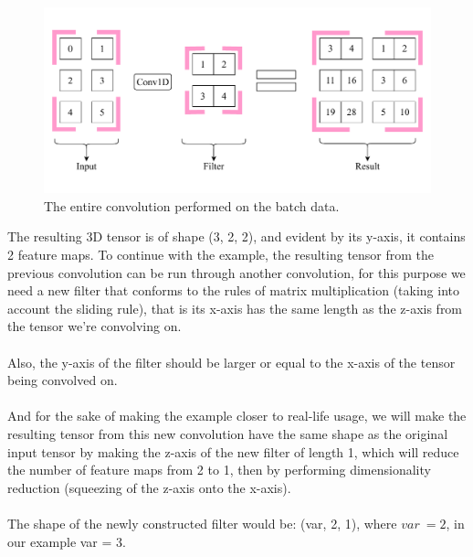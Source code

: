 \documentclass[12pt]{article}
\newcommand\tab[1][1cm]{\hspace*{#1}}
\begin{document}
\begin{figure}[!htbp]
\begin{center}
	\includegraphics[width=\textwidth]{firstConvSample_final}
	\begin{center}
		\caption{ The entire convolution performed on the batch data.}
	\end{center}
\end{center}
\end{figure}
\tab The resulting 3D tensor is of shape (3, 2, 2), and evident by its y-axis, it contains 2 feature \tab maps.
\newpage
To continue with the example, the resulting tensor from the previous convolution can be run through another convolution, for this purpose we need a new filter that conforms to the rules of matrix multiplication (taking into account the sliding rule), that is its x-axis has the same length as the z-axis from the tensor we're convolving on.\\\\
Also, the y-axis of the filter should be larger or equal to the x-axis of the tensor being convolved on.\\\\
And for the sake of making the example closer to real-life usage, we will make the resulting tensor from this new convolution have the same shape as the original input tensor by making the z-axis of the new filter of length 1, which will reduce the number of feature maps from 2 to 1, then by performing dimensionality reduction (squeezing of the z-axis onto the x-axis).\\\\
The shape of the newly constructed filter would be: (var, 2, 1), where $ var \>= 2 $, in our example var = 3.\\\\\\
\end{document}
